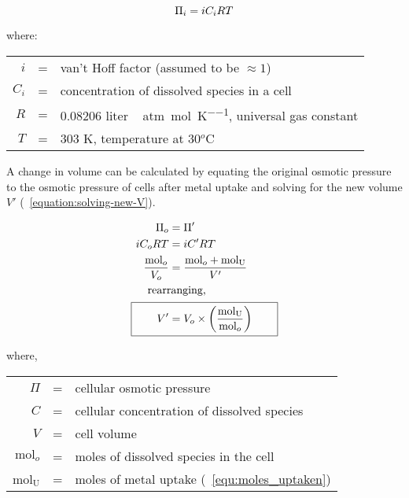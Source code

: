 \documentclass[../main/main]{subfiles}
\begin{document}
\begin{equation}
	\Pi_i = iC_iRT \tagaddtext{[atm]}
	\label{equation:omsotic-pressure}
\end{equation}

where:
\begin{center}
	\begin{tabularx}{.75\textwidth}{r c X}
		$i$ & = & van't Hoff factor (assumed to be $\approx 1$) \\
		$C_i$ & = & concentration of dissolved species in a cell \\
		$R$ & = & 0.08206 \si{liter\,atm\per\mol\per\kelvin}, universal gas constant \\
		$T$ & = & 303 \si{\kelvin}, temperature at 30$^o$C
	\end{tabularx}
	\addtocounter{table}{-1}
\end{center}
\vspace{-\baselineskip}

A change in volume can be calculated by equating the original osmotic pressure to the osmotic pressure of cells after metal uptake and solving for the new volume $V'$ (\EQUATION~\ref{equation:solving-new-V}).

\begin{align}
	\Pi_o &= \Pi' \\
	iC_oRT & = iC'RT \\
	\dfrac{\text{mol}_o}{V_o} & = \dfrac{\text{mol}_o + \text{mol}_\text{U}}{V'} \\
	\intertext{\indent rearranging,}
	\Aboxed{\qquad
	V' &= V_o \times \left(\dfrac{\text{mol}_\text{U}}{\text{mol}_o} \right)
	\qquad}
	\label{equation:solving-new-V}
\end{align}

where,
\begin{center}
	\begin{tabularx}{.75\textwidth}{r c X}
		$\Pi$ & = &  cellular osmotic pressure \\
		$C$ & = &  cellular concentration of dissolved species \\
		$V$ & = &  cell volume \\
		$\text{mol}_o$ & = & moles of dissolved species in the cell  \\
		mol$_{\text{U}}$ & = & moles of metal uptake (\EQUATION~\ref{equ:moles_uptaken})
	\end{tabularx}
	\addtocounter{table}{-1}
\end{center}
\vspace{-\baselineskip}
\end{document}
